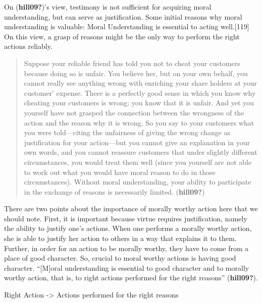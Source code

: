 \documentclass[12pt]{book}
\theoremstyle{definition}
\theoremstyle{remark}
\newcommand{\NormalTok}[1]{#1}
\newenvironment{Shaded}{}{}
\newenvironment{Highlighting}{}{}
\begin{document}
On (\textbf{hill09?})'s view, testimony is not sufficient for acquiring moral understanding, but can serve as justification. Some initial reasons why moral understanding is valuable: Moral Understanding is essential to acting well.{[}119{]} On this view, a grasp of reasons might be the only way to perform the right actions reliably.

\begin{quote}
Suppose your reliable friend has told you not to cheat your customers because doing so is unfair. You believe her, but on your own behalf, you cannot really see anything wrong with enriching your share holders at your customer' expense. There is a perfectly good sense in which you know why cheating your customers is wrong: you know that it is unfair. And yet you yourself have not grasped the connection between the wrongness of the action and the reason why it is wrong. So you say to your customers what you were told---citing the unfairness of giving the wrong change as justification for your action---but you cannot give an explanation in your own words, and you cannot reassure customers that under slightly different circumstances, you would treat them well (since you yourself are not able to work out what you would have moral reason to do in those circumstances). Without moral understanding, your ability to participate in the exchange of reasons is necessarily limited. (\textbf{hill09?})
\end{quote}

There are two points about the importance of morally worthy action here that we should note. First, it is important because virtue requires justification, namely the ability to justify one's actions. When one performs a morally worthy action, she is able to justify her action to others in a way that explains it to them. Further, in order for an action to be morally worthy, they have to come from a place of good character. So, crucial to moral worthy actions is having good character. ``{[}M{]}oral understanding is essential to good character and to morally worthy action, that is, to right actions performed for the right reasons'' (\textbf{hill09?}).

\begin{Shaded}
\begin{Highlighting}[]

\NormalTok{Right Action {-}\textgreater{} Actions performed for the right reasons}
\end{Highlighting}
\end{Shaded}
\end{document}
